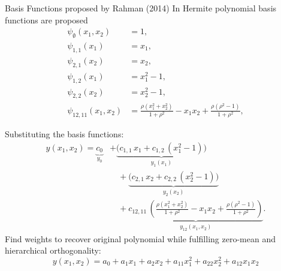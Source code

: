 \begin{frame}{Basis Functions proposed by Rahman (2014)}
  In \cite{rahman2014} Hermite polynomial basis functions are proposed
  \begin{align*}
    \psi_{\emptyset}(x_1,x_2) &= 1, \\[0.5em]
\psi_{1,1}(x_1) &= x_1, \\[0.5em]
\psi_{2,1}(x_2) &= x_2, \\[0.5em]
\psi_{1,2}(x_1) &= x_1^2 - 1, \\[0.5em]
\psi_{2,2}(x_2) &= x_2^2 - 1, \\[0.5em]
\psi_{12,11}(x_1,x_2) &= \frac{\rho (x_1^2 + x_2^2)}{1 + \rho^2} 
                         - x_1 x_2 
                         + \frac{\rho(\rho^2 - 1)}{1 + \rho^2},
\end{align*}
\end{frame}


\begin{frame}
  Substituting the basis functions:
  \begin{align*}
   y(x_1,x_2)  = \underbrace{c_0}_{y_0}
   &+ \underbrace{\big(c_{1,1}\,x_1 
                     + c_{1,2}\,(x_1^2 - 1)\big)}_{y_1(x_1)} \\[0.5em]
   &\quad
   + \underbrace{\big(c_{2,1}\,x_2 
                     + c_{2,2}\,(x_2^2 - 1)\big)}_{y_2(x_2)} \\[0.5em]
   &\quad
   + \underbrace{c_{12,11}\,\left(\frac{\rho (x_1^2 + x_2^2)}{1 + \rho^2} 
                         - x_1 x_2 
                         + \frac{\rho(\rho^2 - 1)}{1 + \rho^2}\right)}_{y_{12}(x_1,x_2)}.
\end{align*}
Find weights to recover original polynomial while fulfilling zero-mean and hierarchical orthogonality:
\[
y(x_1,x_2) = a_0 + a_1 x_1 + a_2 x_2 
   + a_{11} x_1^2 + a_{22} x_2^2 + a_{12} x_1 x_2 
\]

\end{frame}

